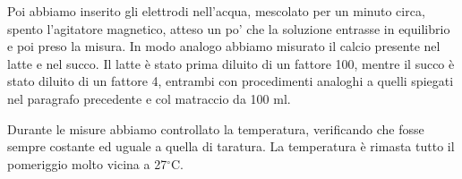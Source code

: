 Poi abbiamo inserito gli elettrodi nell'acqua, mescolato per un minuto circa, spento l'agitatore magnetico,
atteso un po' che la soluzione entrasse in equilibrio e poi preso la misura. In modo analogo abbiamo
misurato il calcio presente nel latte e nel succo. Il latte è stato prima diluito di un fattore 100,
mentre il succo è stato diluito di un fattore 4, entrambi con procedimenti analoghi a quelli spiegati nel paragrafo
precedente e col matraccio da 100 ml.

Durante le misure abbiamo controllato la temperatura, verificando che fosse sempre costante ed uguale a quella di taratura.
La temperatura è rimasta tutto il pomeriggio molto vicina a 27$^\circ$C.
